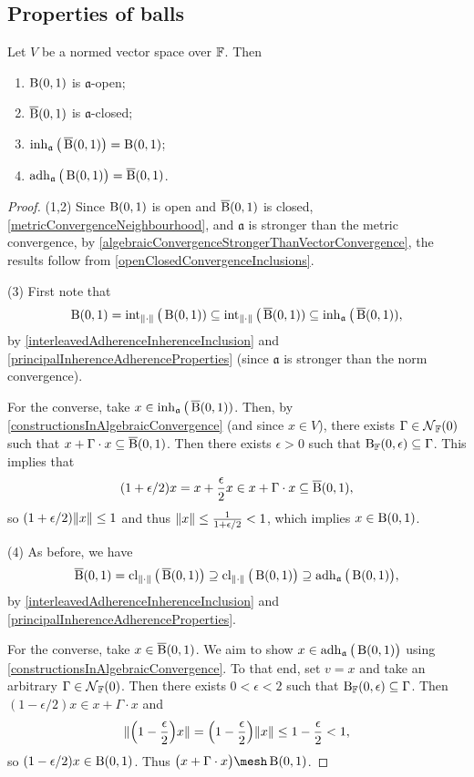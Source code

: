 \subsection{Properties of balls}
\begin{lemma} \label{ballAdherenceInherence}
Let $V$ be a normed vector space over $\mathbb{F}$. Then
\begin{enumerate}
\item $\operatorname{B}(0,1)$ is $\mathfrak{a}$-open;
\item $\operatorname{\overline{B}}(0,1)$ is $\mathfrak{a}$-closed;
\item $\operatorname{inh}_\mathfrak{a}\big(\operatorname{\overline{B}}(0,1)\big) = \operatorname{B}(0,1)$;
\item $\operatorname{adh}_\mathfrak{a}\big(\operatorname{B}(0,1)\big) = \operatorname{\overline{B}}(0,1)$.
\end{enumerate}
\end{lemma}
\begin{proof}
(1,2) Since $\operatorname{B}(0,1)$ is open and $\operatorname{\overline{B}}(0,1)$ is closed, \ref{metricConvergenceNeighbourhood}, and $\mathfrak{a}$ is stronger than the metric convergence, by \ref{algebraicConvergenceStrongerThanVectorConvergence}, the results follow from \ref{openClosedConvergenceInclusions}.

(3) First note that
\[ \operatorname{B}(0,1) = \operatorname{int}_{\lVert\cdot\rVert}\big(\operatorname{B}(0,1)) \subseteq \operatorname{int}_{\lVert\cdot\rVert}\big(\operatorname{\overline{B}}(0,1)) \subseteq \operatorname{inh}_{\mathfrak{a}}\big(\operatorname{\overline{B}}(0,1)), \]
by \ref{interleavedAdherenceInherenceInclusion} and \ref{principalInherenceAdherenceProperties} (since $\mathfrak{a}$ is stronger than the norm convergence).

For the converse, take $x\in \operatorname{inh}_{\mathfrak{a}}\big(\operatorname{\overline{B}}(0,1))$. Then, by \ref{constructionsInAlgebraicConvergence} (and since $x\in V$), there exists $\Gamma\in \operatorname{\mathcal{N}}_{\mathbb{F}}(0)$ such that $x+ \Gamma\cdot x \subseteq \operatorname{\overline{B}}(0,1)$. Then there exists $\epsilon >0$ such that $\operatorname{B}_{\mathbb{F}}(0,\epsilon) \subseteq \Gamma$. This implies that
\[ (1+ \epsilon/2)x = x + \frac{\epsilon}{2} x \in x+ \Gamma\cdot x \subseteq \operatorname{\overline{B}}(0,1), \]
so $(1+\epsilon/2)\lVert x\rVert \leq 1$ and thus $\lVert x\rVert \leq \frac{1}{1+\epsilon / 2} < 1$, which implies $x\in \operatorname{B}(0,1)$.

(4) As before, we have
\[ \operatorname{\overline{B}}(0,1) = \operatorname{cl}_{\lVert\cdot\rVert}\big(\operatorname{\overline{B}}(0,1)\big) \supseteq \operatorname{cl}_{\lVert\cdot\rVert}\big(\operatorname{B}(0,1)\big) \supseteq \operatorname{adh}_{\mathfrak{a}}\big(\operatorname{B}(0,1)\big), \]
by \ref{interleavedAdherenceInherenceInclusion} and \ref{principalInherenceAdherenceProperties}.

For the converse, take $x\in \operatorname{\overline{B}}(0,1)$. We aim to show $x\in \operatorname{adh}_\mathfrak{a}\big(\operatorname{B}(0,1)\big)$ using \ref{constructionsInAlgebraicConvergence}. To that end, set $v = x$ and take an arbitrary $\Gamma\in \operatorname{\mathcal{N}}_{\mathbb{F}}(0)$. Then there exists $0<\epsilon <2$ such that $\operatorname{B}_{\mathbb{F}}(0,\epsilon) \subseteq \Gamma$. Then $(1-\epsilon /2)x \in x + \Gamma\cdot x$ and
\[ \lVert\Big(1-\frac{\epsilon}{2}\Big)x\rVert = \Big(1-\frac{\epsilon}{2}\Big)\lVert x\rVert \leq 1-\frac{\epsilon}{2} < 1, \]
so $(1-\epsilon /2)x\in \operatorname{B}(0,1)$. Thus $\big(x + \Gamma\cdot x\big)\mesh \ball(0,1)$.
\end{proof}


